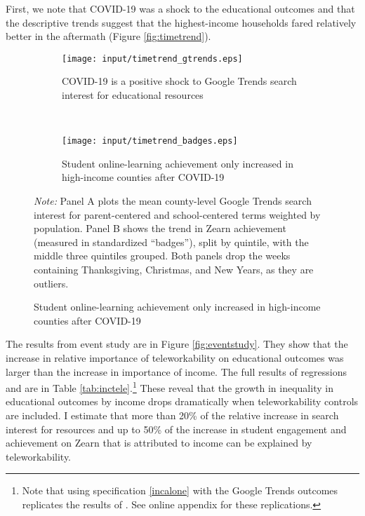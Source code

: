 First, we note that COVID-19 was a shock to the educational outcomes and that
the descriptive trends suggest that the highest-income households
fared relatively better in the aftermath (Figure \ref{fig:timetrend}).
\begin{figure}[hbt!]
    \caption{}
    \label{fig:timetrend}
    \begin{subfigure}[t]{0.49\textwidth}
  \caption{COVID-19 is a positive shock to Google Trends search interest for educational resources}
    \centering
    \texttt{[image: input/timetrend\_gtrends.eps]}
    \end{subfigure}
    ~
    \begin{subfigure}[t]{0.49\textwidth}
  \caption{Student online-learning achievement only increased in high-income counties after COVID-19}
    \centering
    \texttt{[image: input/timetrend\_badges.eps]}
    \end{subfigure}
    \begin{minipage}{\textwidth}
        \footnotesize
        \textit{Note:} Panel A plots the mean county-level Google Trends search interest for
        parent-centered and school-centered terms weighted by population.
        Panel B shows the trend in Zearn achievement (measured in standardized ``badges''),
        split by quintile, with the middle three quintiles grouped.
        Both panels drop the weeks containing Thanksgiving, Christmas, and New Years,
        as they are outliers.
    \end{minipage}
\end{figure}
The results from event study  are in Figure \ref{fig:eventstudy}.
They show that the increase in relative importance of teleworkability on educational outcomes was larger than the increase in importance of income.
The full results of regressions  and  are in Table \ref{tab:inctele}.\footnote{Note that using specification \ref{incalone} with the Google Trends outcomes replicates the results of \cite{bh1}. See online appendix for these replications.}
These reveal that the growth in inequality in educational outcomes by income drops dramatically when teleworkability controls are included.
I estimate that more than 20\% of the relative increase in search interest for resources and up to 50\% of the increase in student engagement and achievement on Zearn that is attributed to income can be explained by teleworkability.

